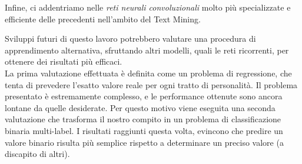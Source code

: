 Infine, ci addentriamo nelle \emph{reti neurali convoluzionali} molto più specializzate e efficiente delle precedenti nell'ambito del Text Mining.

Sviluppi futuri di questo lavoro potrebbero valutare una procedura di apprendimento alternativa, sfruttando altri modelli, quali le reti ricorrenti,  per ottenere dei risultati più efficaci.\\


La prima valutazione effettuata è definita come un problema di regressione, che tenta di prevedere l'esatto valore reale per ogni tratto di personalità.
Il problema presentato è estremamente complesso, e le performance ottenute sono ancora lontane da quelle desiderate.
Per questo motivo viene eseguita una seconda valutazione che trasforma il nostro compito in un problema di classificazione binaria multi-label.
I risultati raggiunti questa volta, evincono che predire un valore binario risulta più semplice rispetto a determinare un preciso valore (a discapito di altri).